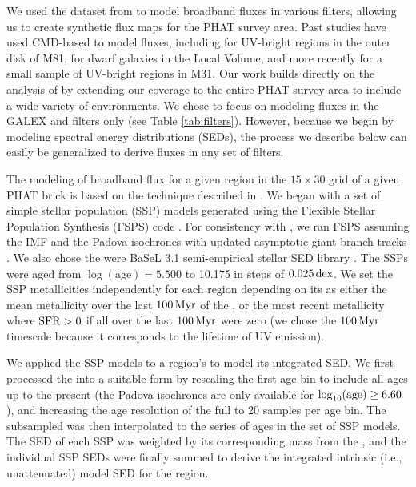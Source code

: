 \documentclass[iop, tighten]{emulateapj}
\begin{document}
We used the \sfh{} dataset from \citet{Lewis:2014} to model broadband fluxes in
various filters, allowing us to create synthetic flux maps for the PHAT survey
area. Past studies have used CMD-based  to model fluxes, including
\citet{Gogarten:2009} for UV-bright regions in the outer disk of M81,
\citet{Johnson:2013} for dwarf galaxies in the Local Volume, and more recently
\citet{Simones:2014} for a small sample of UV-bright regions in M31. Our work
builds directly on the analysis of \citet{Simones:2014} by extending our
coverage to the entire PHAT survey area to include a wide variety of
environments. We chose to focus on modeling fluxes in the GALEX \fuv{} and
\nuv{} filters only (see Table \ref{tab:filters}). However, because we begin by
modeling spectral energy distributions (SEDs), the process we describe below
can easily be generalized to derive fluxes in any set of filters.

The modeling of broadband flux for a given region in the $15 \times 30$ grid of
a given PHAT brick is based on the technique described in \citet{Johnson:2013}.
We began with a set of simple stellar population (SSP) models generated using
the Flexible Stellar Population Synthesis (FSPS) code \citep{Conroy:2009,
Conroy:2010}. For consistency with \citet{Lewis:2014}, we ran FSPS assuming the
\citet{Kroupa:2001} IMF and the Padova isochrones \citep{Marigo:2008} with
updated asymptotic giant branch tracks \citep{Girardi:2010}. We also chose the
were BaSeL 3.1 semi-empirical stellar SED library \citep{Westera:2002}. The
SSPs were aged from $\log(\mathrm{age})=5.500$ to 10.175 in steps of
$0.025\,\mathrm{dex}$. We set the SSP metallicities independently for each region
depending on its \sfh{} as either the mean metallicity over the last $100\,\mathrm{Myr}$
of the \sfh{}, or the most recent metallicity where $\mathrm{SFR} > 0$ if all 
over the last $100\,\mathrm{Myr}$ were zero (we chose the $100\,\mathrm{Myr}$ timescale because it
corresponds to the lifetime of UV emission).

We applied the SSP models to a region's \sfh{} to model its integrated SED. We
first processed the \sfh{} into a suitable form by rescaling the first age bin
to include all ages up to the present (the Padova isochrones are only available
for $\log_{10}(\mathrm{age}) \ge 6.60$), and increasing the age resolution of the
full \sfh{} to 20 samples per age bin. The subsampled \sfh{} was then
interpolated to the series of ages in the set of SSP models. The SED of each
SSP was weighted by its corresponding mass from the \sfh{}, and the individual
SSP SEDs were finally summed to derive the integrated intrinsic (i.e.,
unattenuated) model SED for the region.
\end{document}
